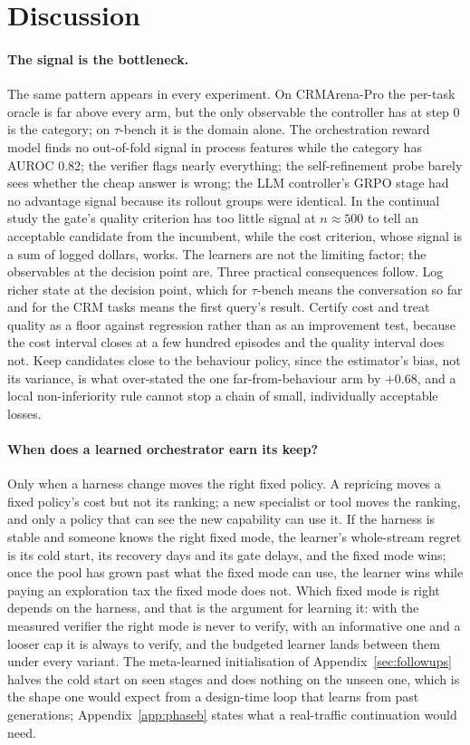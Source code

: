 \documentclass[10pt]{article}
\begin{document}
\section{Discussion}
\label{sec:discussion}

\paragraph{The signal is the bottleneck.} The same pattern appears in every experiment. On CRMArena-Pro the per-task oracle is far above every arm, but the only observable the controller has at step 0 is the category; on $\tau$-bench it is the domain alone. The orchestration reward model finds no out-of-fold signal in process features while the category has AUROC 0.82; the verifier flags nearly everything; the self-refinement probe barely sees whether the cheap answer is wrong; the LLM controller's GRPO stage had no advantage signal because its rollout groups were identical. In the continual study the gate's quality criterion has too little signal at $n\approx500$ to tell an acceptable candidate from the incumbent, while the cost criterion, whose signal is a sum of logged dollars, works. The learners are not the limiting factor; the observables at the decision point are. Three practical consequences follow. Log richer state at the decision point, which for $\tau$-bench means the conversation so far and for the CRM tasks means the first query's result. Certify cost and treat quality as a floor against regression rather than as an improvement test, because the cost interval closes at a few hundred episodes and the quality interval does not. Keep candidates close to the behaviour policy, since the estimator's bias, not its variance, is what over-stated the one far-from-behaviour arm by $+0.68$, and a local non-inferiority rule cannot stop a chain of small, individually acceptable losses.

\paragraph{When does a learned orchestrator earn its keep?} Only when a harness change moves the right fixed policy. A repricing moves a fixed policy's cost but not its ranking; a new specialist or tool moves the ranking, and only a policy that can see the new capability can use it. If the harness is stable and someone knows the right fixed mode, the learner's whole-stream regret is its cold start, its recovery days and its gate delays, and the fixed mode wins; once the pool has grown past what the fixed mode can use, the learner wins while paying an exploration tax the fixed mode does not. Which fixed mode is right depends on the harness, and that is the argument for learning it: with the measured verifier the right mode is never to verify, with an informative one and a looser cap it is always to verify, and the budgeted learner lands between them under every variant. The meta-learned initialisation of Appendix~\ref{sec:followups} halves the cold start on seen stages and does nothing on the unseen one, which is the shape one would expect from a design-time loop that learns from past generations; Appendix~\ref{app:phaseb} states what a real-traffic continuation would need.
\end{document}
